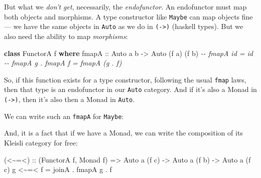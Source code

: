 \documentclass[]{article}
\newenvironment{Shaded}{}{}
\newcommand{\CommentTok}[1]{\textcolor[rgb]{0.38,0.63,0.69}{\textit{#1}}}
\newcommand{\DataTypeTok}[1]{\textcolor[rgb]{0.56,0.13,0.00}{#1}}
\newcommand{\KeywordTok}[1]{\textcolor[rgb]{0.00,0.44,0.13}{\textbf{#1}}}
\newcommand{\NormalTok}[1]{#1}
\newcommand{\OperatorTok}[1]{\textcolor[rgb]{0.40,0.40,0.40}{#1}}
\newcommand{\OtherTok}[1]{\textcolor[rgb]{0.00,0.44,0.13}{#1}}
\begin{document}
But what we \emph{don't get}, necessarily, the \emph{endofunctor}. An
endofunctor must map both objects and morphisms. A type constructor like
\texttt{Maybe} can map objects fine --- we have the same objects in
\texttt{Auto} as we do in \texttt{(-\textgreater{})} (haskell types). But we
also need the ability to map \emph{morphisms}:

\begin{Shaded}
\begin{Highlighting}[]
\KeywordTok{class} \DataTypeTok{FunctorA}\NormalTok{ f }\KeywordTok{where}
\OtherTok{    fmapA ::} \DataTypeTok{Auto}\NormalTok{ a b }\OtherTok{{-}>} \DataTypeTok{Auto}\NormalTok{ (f a) (f b)}
    \CommentTok{{-}{-} fmapA id = id}
    \CommentTok{{-}{-} fmapA g . fmapA f = fmapA (g . f)}
\end{Highlighting}
\end{Shaded}

So, if this function exists for a type constructor, following the usual
\texttt{fmap} laws, then that type is an endofunctor in our \texttt{Auto}
category. And if it's also a Monad in \texttt{(-\textgreater{})}, then it's also
then a Monad in \texttt{Auto}.

We can write such an \texttt{fmapA} for \texttt{Maybe}:

\begin{Shaded}
\end{Shaded}

And, it is a fact that if we have a Monad, we can write the composition of its
Kleisli category for free:

\begin{Shaded}
\begin{Highlighting}[]
\OtherTok{(<\textasciitilde{}=<) ::}\NormalTok{ (}\DataTypeTok{FunctorA}\NormalTok{ f, }\DataTypeTok{Monad}\NormalTok{ f) }\OtherTok{=>} \DataTypeTok{Auto}\NormalTok{ a (f c) }\OtherTok{{-}>} \DataTypeTok{Auto}\NormalTok{ a (f b) }\OtherTok{{-}>} \DataTypeTok{Auto}\NormalTok{ a (f c)}
\NormalTok{g }\OperatorTok{<\textasciitilde{}=<}\NormalTok{ f }\OtherTok{=}\NormalTok{ joinA }\OperatorTok{.}\NormalTok{ fmapA g }\OperatorTok{.}\NormalTok{ f}
\end{Highlighting}
\end{Shaded}
\end{document}
